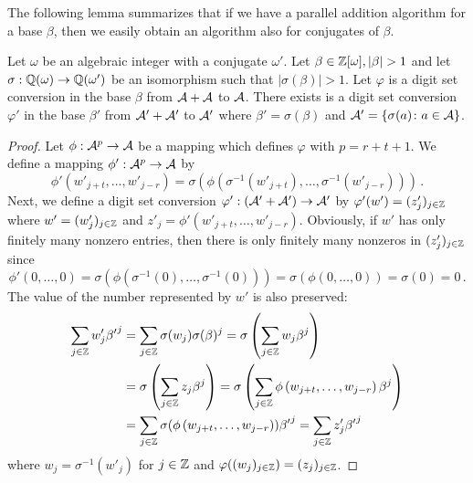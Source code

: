 The following lemma summarizes that if we have a parallel addition algorithm for a base $\beta$, then we easily obtain an algorithm also for conjugates of $\beta$.
\begin{lem}
\label{lem:parAddAlgForConjugate}
Let $\omega$ be an algebraic integer with a conjugate $\omega'$. Let $\beta\in\Zomega, |\beta|>1$ and let $\sigma:\mathbb{Q}(\omega)\rightarrow \mathbb{Q}(\omega')$ be an isomorphism such that $|\sigma(\beta)|>1$. Let $\varphi$ is a digit set conversion  in the base $\beta$ from $\mathcal{A}+\mathcal{A}$ to $\mathcal{A}$. There exists  is a digit set conversion $\varphi'$ in the base $\beta'$ from $\mathcal{A}'+\mathcal{A}'$ to $\mathcal{A}'$ where $\beta'=\sigma(\beta)$ and $\mathcal{A}'=\{\sigma(a) \colon a\in\mathcal{A}\}$.
\end{lem}
\begin{proof}
Let $\phi:\mathcal{A}^p\rightarrow\mathcal{A}$ be a mapping which defines $\varphi$ with $p=r+t+1$. We define a mapping $\phi':\mathcal{A}^p\rightarrow \mathcal{A}$ by 
$$
\phi'(w'_{j+t}, \dots, w'_{j-r})=\sigma\left(\phi\left(\sigma^{-1}(w'_{j+t}), \dots, \sigma^{-1}(w'_{j-r})\right)\right)\,.
$$
Next, we define a digit set conversion  $\varphi':(\mathcal{A}'+\mathcal{A}')\rightarrow\mathcal{A}'$ by $\varphi'(w')=(z'_j)_{j\in\mathbb{Z}}$ where $w'=(w'_j)_{j\in\mathbb{Z}}$ and $z'_j=\phi'(w'_{j+t}, \dots, w'_{j-r})$. Obviously, if $w'$ has only finitely many nonzero entries, then there is only finitely many nonzeros in $(z'_j)_{j\in\mathbb{Z}}$   since
$$
\phi'(0, \dots, 0)=\sigma\left(\phi\left(\sigma^{-1}(0), \dots, \sigma^{-1}(0)\right)\right)=\sigma\left(\phi\left(0, \dots, 0\right)\right)=\sigma\left(0\right)=0\,.
$$
The value of the number represented by $w'$ is also preserved:
\begin{align*}
\sum_{j\in\mathbb{Z}}w'_j {\beta'}^j&=\sum_{j\in\mathbb{Z}}\sigma(w_j) \sigma(\beta)^j=\sigma\left(\sum_{j\in\mathbb{Z}}w_j\beta^j\right) \\
&=\sigma\left(\sum_{j\in\mathbb{Z}}z_j\beta^j \right)=\sigma\left(\sum_{j\in\mathbb{Z}}\phi\left(w_{j+t}, \dots,w_{j-r}\right)\beta^j\right) \\
&=\sum_{j\in\mathbb{Z}}\sigma(\phi\left(w_{j+t}, \dots,w_{j-r}\right)){\beta'}^j=\sum_{j\in\mathbb{Z}}z'_j {\beta'}^j
\end{align*}
where $w_j=\sigma^{-1}(w'_j)$ for $j\in\mathbb{Z}$ and $\varphi((w_j)_{j\in\mathbb{Z}})=(z_j)_{j\in\mathbb{Z}}$.
\end{proof}


